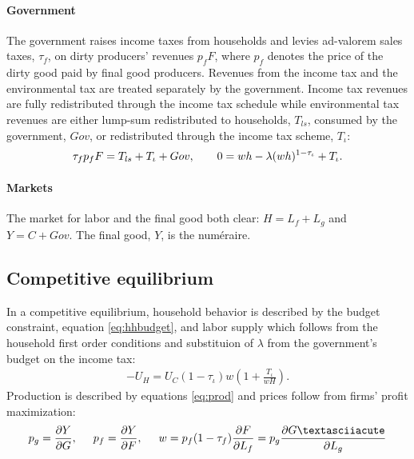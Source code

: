 \paragraph{Government}
The government raises income taxes from households and levies ad-valorem sales taxes, $\tau_f$, on dirty producers' revenues $p_fF$, where $p_f$ denotes the price of the dirty good paid by final good producers. Revenues from the income tax and the environmental tax are treated separately by the government. Income tax revenues are fully redistributed through the income tax schedule while environmental tax revenues are either lump-sum redistributed to households, $T_{ls}$, consumed by the government, $Gov$, or redistributed through the income tax scheme, $T_\iota$:
\begin{align}
\tau_{f}p_fF=T_{ls}+T_\iota+Gov, \hspace{7mm}
0={w h}-\lambda(w h)^{1-\tau_{\iota}}+T_\iota.
\end{align}

\paragraph{Markets}
The market for labor and the final good both clear: $H=L_f+L_g$ and $Y=C+Gov$. The final good, $Y$, is the numéraire.
\subsection{Competitive equilibrium}
In a competitive equilibrium, household behavior is described by the budget constraint, equation \ref{eq:hhbudget}, and labor supply which follows from the household first order conditions and substituion of $\lambda$ from the government's budget on the income tax:
\begin{align}
-U_H=U_C(1-\tau_{\iota})w\left(1+\frac{T_\iota}{wH}\right). \label{eq:hsup}
\end{align}
Production is described by equations \ref{eq:prod} and prices follow from firms' profit maximization:
\begin{align}
p_g=\frac{\partial Y}{\partial G}, \hspace{5mm}
p_f = \frac{\partial Y}{\partial F}, \hspace{5mm}
w= p_f(1-\tau_f)\frac{\partial F}{\partial L_f}=p_g\frac{\partial G´}{\partial L_g}\label{eq:profmax}
\end{align}
